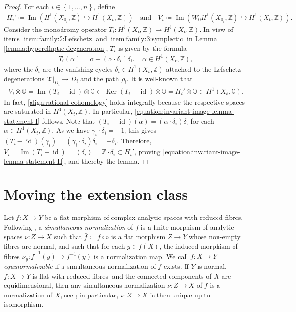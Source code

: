 \documentclass[a4paper,11pt,reqno]{amsart}
\numberwithin{equation}{section}
\theoremstyle{plain}
\theoremstyle{definition}
\newcommand{\Z}{\mathbb Z}
\newcommand{\Q}{\mathbb Q}
\newcommand{\Ima}{\operatorname{Im}}
\newcommand{\id}{\operatorname{id}}
\newcommand{\Ker}{\operatorname{Ker}}
\newcommand{\ca}[1]{{\mathcal{#1}}}
\newcommand{\set}[1]{\left\{ #1 \right\}}
\begin{document}
\begin{proof}
 For each $i \in \set{1, \dotsc, n}$, define \begin{align*}H_i' \coloneqq \Ima\left(
H^1(X_{0_i},\Z) \hookrightarrow H^1(X_t,\Z)
\right) \quad \text{and}\quad V_i \coloneqq \Ima\left(W_0H^1(X_{0_i},\Z) \hookrightarrow H^1(X_t,\Z)
\right).\end{align*}
 Consider the monodromy operator 
$
T_i \colon H^1(X_t,\Z) \to H^1(X_t,\Z)$. In view of items \eqref{item:family:2:Lefschetz} and \ref{item:family:3:symplectic} in Lemma \ref{lemma:hyperelliptic-degeneration}, $T_i$ is given by the formula 
 \begin{align*}
 T_i(\alpha)=\alpha + (\alpha\cdot \delta_i)\delta_i, \quad \alpha \in H^1(X_t,\Z),
 \end{align*}
 where the $\delta_i$ are the vanishing cycles $\delta_i \in H^1(X_t,\Z)$ attached to the Lefschetz degenerations $\ca X|_{D_i} \to D_i$ and the path $\rho_i$. 
 It is well-known that 
\begin{align} \label{align:rational-cohomology}
V_i \otimes \Q = \Ima(T_i - \id) \otimes \Q \subset\Ker(T_i - \id) \otimes \Q =  H_i' \otimes \Q \subset H^1(X_t,\Q). 
\end{align}
In fact, \eqref{align:rational-cohomology} holds integrally because the respective spaces are saturated in $H^1(X_t,\Z)$.
In particular, \eqref{equation:invariant-image-lemma-statement-I} follows. 
 Note that $(T_i - \id)(\alpha) = (\alpha \cdot \delta_i)\delta_i$ for each $\alpha \in H^1(X_t,\Z)$. 
 As we have $\gamma_i \cdot \delta_i = -1$, this gives
$
\left(T_i - \id \right)(\gamma_i) = (\gamma_i \cdot \delta_i) \delta_i = -\delta_i.
$
Therefore, 
$
V_i = \Ima\left(T_i - \id\right) = \left\langle \delta_i   \right \rangle = \Z \cdot \delta_i \subset H_i'$, proving \eqref{equation:invariant-image-lemma-statement-II}, and thereby the lemma.
\end{proof}

\section{Moving the extension class} \label{section:movingextension}

Let $f \colon X \to Y$ be a flat morphism of complex analytic spaces with reduced fibres. Following \cite[Definition 5.3]{chiang-lipman-simultaneous}, a \emph{simultaneous normalization} of $f$ is a finite morphism of analytic spaces $\nu \colon Z \to X$ such that $\bar f \coloneqq f \circ \nu$ is a flat morphism $Z \to Y$ whose non-empty fibres are normal, and such that for each $y \in f(X)$, the induced morphism of fibres $\nu_y \colon \bar f^{-1}(y) \to f^{-1}(y)$ is a normalization map.  
We call $f \colon X \to Y$ \emph{equinormalizable} if a simultaneous normalization of $f$ exists. If $Y$ is normal, $f \colon X \to Y$ is flat with reduced fibres, and the connected components of $X$ are equidimensional, then any simultaneous normalization $\nu \colon Z \to X$ of $f$ is a normalization of $X$, see \cite[Proposition 5.4]{chiang-lipman-simultaneous}; in particular, $\nu \colon Z \to X$ is then unique up to isomorphism. 
 
\end{document}
